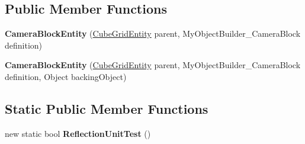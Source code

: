 \subsection*{Public Member Functions}
\begin{DoxyCompactItemize}
\item 
\hypertarget{class_s_e_mod_a_p_i_internal_1_1_a_p_i_1_1_entity_1_1_sector_1_1_sector_object_1_1_cube_grid_1_1f9cfafaa5312bbae2c6d791b4030f3b9_a70595ae72784fe29606bf5c6985a8d40}{}{\bfseries Camera\+Block\+Entity} (\hyperlink{class_s_e_mod_a_p_i_internal_1_1_a_p_i_1_1_entity_1_1_sector_1_1_sector_object_1_1_cube_grid_entity}{Cube\+Grid\+Entity} parent, My\+Object\+Builder\+\_\+\+Camera\+Block definition)\label{class_s_e_mod_a_p_i_internal_1_1_a_p_i_1_1_entity_1_1_sector_1_1_sector_object_1_1_cube_grid_1_1f9cfafaa5312bbae2c6d791b4030f3b9_a70595ae72784fe29606bf5c6985a8d40}

\item 
\hypertarget{class_s_e_mod_a_p_i_internal_1_1_a_p_i_1_1_entity_1_1_sector_1_1_sector_object_1_1_cube_grid_1_1f9cfafaa5312bbae2c6d791b4030f3b9_a8ec08d992c2dfed9c49e1f2f59e53cfc}{}{\bfseries Camera\+Block\+Entity} (\hyperlink{class_s_e_mod_a_p_i_internal_1_1_a_p_i_1_1_entity_1_1_sector_1_1_sector_object_1_1_cube_grid_entity}{Cube\+Grid\+Entity} parent, My\+Object\+Builder\+\_\+\+Camera\+Block definition, Object backing\+Object)\label{class_s_e_mod_a_p_i_internal_1_1_a_p_i_1_1_entity_1_1_sector_1_1_sector_object_1_1_cube_grid_1_1f9cfafaa5312bbae2c6d791b4030f3b9_a8ec08d992c2dfed9c49e1f2f59e53cfc}

\end{DoxyCompactItemize}
\subsection*{Static Public Member Functions}
\begin{DoxyCompactItemize}
\item 
\hypertarget{class_s_e_mod_a_p_i_internal_1_1_a_p_i_1_1_entity_1_1_sector_1_1_sector_object_1_1_cube_grid_1_1f9cfafaa5312bbae2c6d791b4030f3b9_a566fba6e72fd660db32e928f31950210}{}new static bool {\bfseries Reflection\+Unit\+Test} ()\label{class_s_e_mod_a_p_i_internal_1_1_a_p_i_1_1_entity_1_1_sector_1_1_sector_object_1_1_cube_grid_1_1f9cfafaa5312bbae2c6d791b4030f3b9_a566fba6e72fd660db32e928f31950210}

\end{DoxyCompactItemize}
